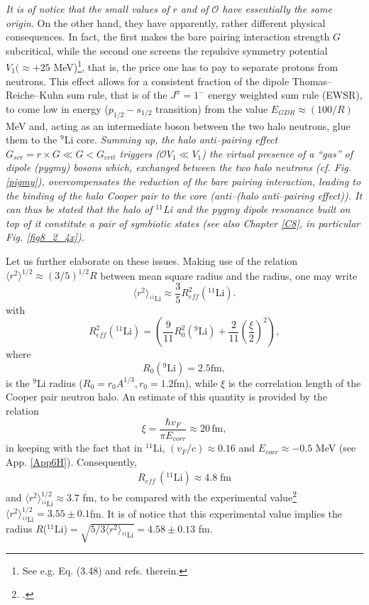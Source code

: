 \textit{It is of notice that the small values of $r$ and of $\mathcal{O}$ have essentially the same origin}. On the other hand, they have apparently, rather different physical consequences. In fact, the first makes the bare pairing interaction strength $G$ subcritical, while the second one screens the repulsive symmetry potential $V_1(\approx +25 $ MeV)\footnote{See e.g. \cite{Bortignon:98} Eq. (3.48) and refs. therein.}, that is, the price one has to pay to separate protons from neutrons. This effect allows for a consistent fraction of the dipole Thomas--Reiche--Kuhn sum rule, that is of the $J^{\pi}=1^-$ energy weighted sum rule (EWSR), to come low in energy ($p_{1/2}-s_{1/2}$ transition) from the value $E_{GDR}\approx(100/R)$ MeV and, acting as an intermediate boson between the two halo neutrons, glue them to the $^{9}$Li core. \textit{Summing up, the halo anti--pairing effect $G_{scr}=r\times G\ll G<G_{crit}$ triggers ($\mathcal{O}V_1\ll V_1$) the virtual presence of a ``gas'' of dipole (pygmy) bosons which, exchanged between the two halo neutrons (cf. Fig. \ref{pigmy}), overcompensates the reduction of the bare pairing interaction, leading to the binding of the halo Cooper pair to the core (anti--(halo anti--pairing effect)). It can thus be stated that the halo of $^{11}$Li and the pygmy dipole resonance built on top of it constitute a pair of symbiotic states (see also Chapter \ref{C8}, in particular Fig. \ref{fig8_2_4x}).}

Let us further elaborate on these issues. Making use of the relation $\langle r^2\rangle^{1/2}\approx (3/5)^{1/2}R$ between mean square radius and the radius, one may write
\begin{equation}\label{eq2.6.9}
\langle r^2\rangle_{^{11}\text{Li}}\approx \frac{3}{5}R_{eff}^2(^{11}\text{Li}).
\end{equation}
 with
\begin{equation}\label{eq2.6.10}
R_{eff}^2(^{11}\text{Li})=\left(\frac{9}{11}R_0^2(^9\text{Li})+\frac{2}{11}\left(\frac{\xi}{2}\right)^2\right),
\end{equation}
where
\begin{equation}
R_0(^9\text{Li})=2.5 \text{fm},
\end{equation}
is the $^9$Li radius ($R_0=r_0A^{1/3}, r_0=1.2$fm), while $\xi$ is the correlation length of the Cooper pair neutron halo. An estimate of this quantity is provided by the relation
 \begin{equation}
\xi=\frac{\hbar v_F}{\pi E_{corr}}\approx 20 \, \text{fm},
 \end{equation}
in keeping with the fact that in $^{11}$Li, $(v_F/c)\approx 0.16$ and $E_{corr}\approx-0.5$ MeV (see App. \ref{App6H}). Consequently, 
\begin{align}\label{eq2.F.5}
R_{eff}\,(^{11}\text{Li})\approx 4.8 \;\text{fm}
\end{align} 
and  $\langle r^2\rangle_{^{11}\text{Li}}^{1/2}\approx 3.7$ fm, to be compared with the experimental value\footnote{\cite{Kobayashi:89}.} $\langle r^2\rangle_{^{11}\text{Li}}^{1/2}= 3.55\pm0.1$fm. It is of notice that this experimental value implies  the radius $R$($^{11}$Li)$=\sqrt{5/3\langle r^2\rangle_{^{11}\text{Li}}}=4.58\pm 0.13$ fm.


